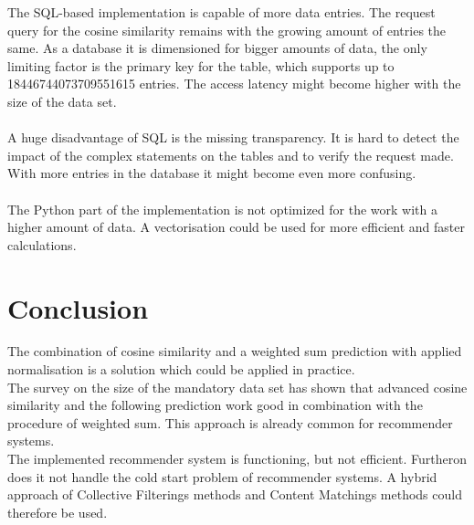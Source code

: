\documentclass[a4paper,12pt,twoside]{article}
\begin{document}
The SQL-based implementation is capable of more data entries. The request query for the cosine similarity remains with the growing amount of entries the same. As a database it is dimensioned for bigger amounts of data, the only limiting factor is the primary key for the table, which supports up to 18446744073709551615 entries. \cite{sql} The access latency might become higher with the size of the data set.\\
\\
A huge disadvantage of SQL is the missing transparency. It is hard to detect the impact of the complex statements on the tables and to verify the request made. With more entries in the database it might become even more confusing.\\
\\
The Python part of the implementation is not optimized for the work with a higher amount of data. A vectorisation could be used for more efficient and faster calculations. 

\section{Conclusion}
The combination of cosine similarity and a weighted sum prediction with applied normalisation is a solution which could be applied in practice. \\
The survey on the size of the mandatory data set has shown that advanced cosine similarity and the following prediction work good in combination with the procedure of weighted sum. This approach is already common for recommender systems.\\
The implemented recommender system is functioning, but not efficient. Furtheron does it not handle the cold start problem of recommender systems. A hybrid approach of Collective Filterings methods and Content Matchings methods could therefore be used.\\ 



 
\end{document}
